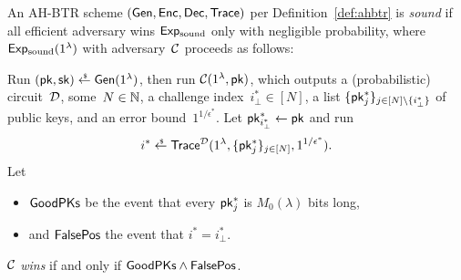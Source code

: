 \begin{definition}[soundness]\label{def:soundness}
An AH-BTR scheme $(\Gen,\Enc,\Dec,\Trace)$ per Definition~\ref{def:ahbtr} is \emph{sound}
if all efficient adversary wins $\ExpSound$ only with negligible probability,
where $\ExpSound(1^\lambda)$ with adversary~${\mathcal{C}}$ proceeds as follows:
\begin{security}
Run ${(\pk,\sk)\draws\Gen(1^\lambda)}$,
then run $\scriptC(1^\lambda,\pk)$, which outputs
a (probabilistic) circuit~${\mathcal{D}}$,
some~${N\in{\mathbb{N}}}$,
a challenge index~${i_\bot^\ast\in[N]}$,
a list $\{\pk^\ast_j\}_{j\in[N]\setminus\{i_\bot^\ast\}}$ of public keys, and
an error bound~$1^{1/\epsilon^\ast}$.
Let ${\pk^\ast_{i_\bot^\ast}\gets\pk}$ and run
\begin{align*}
i^\ast\draws\Trace^\scriptD(1^\lambda,\{\pk^\ast_j\}_{j\in[N]},1^{1/\epsilon^\ast}).
\end{align*}
Let
\begin{itemize}
\item $\GoodPKs$ be the event that every $\pk^\ast_j$ is $M_0(\lambda)$ bits long,
\item and $\FalsePos$ the event that ${i^\ast=i_\bot^\ast}$.
\end{itemize}
${\mathcal{C}}$ \emph{wins} if and only if ${\GoodPKs\wedge\FalsePos}$.
\end{security}
\end{definition}
